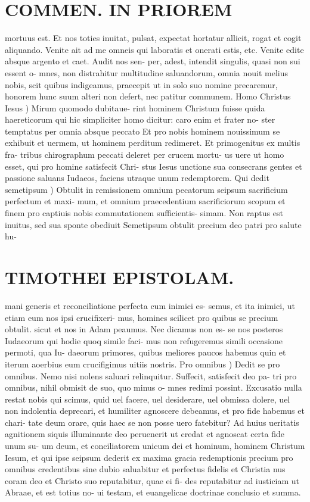 \documentclass{article}
\begin{document}
\begin{pages}
\section*{COMMEN. IN PRIOREM }
\marginpar{[ p.50 ]}\pstart mortuus est. Et nos toties inuitat, pulsat, expectat hortatur allicit, rogat et cogit aliquando. Venite ait ad me omneis qui laboratis et onerati estis, etc. Venite edite absque argento et caet. Audit nos sen- per, adest, intendit singulis, quasi non sui essent o- mnes, non distrahitur multitudine saluandorum, omnia nouit melius nobis, scit quibus indigeamus, praecepit ut in solo suo nomine precaremur, honorem hunc suum alteri non defert, nec patitur communem.  \pend\pstart Homo Christus Iesus ) Mirum quomodo dubitaue- rint hominem Christum fuisse quida haereticorum qui hic simpliciter homo dicitur: caro enim et frater no- ster temptatus per omnia absque peccato Et pro nobis hominem nouissimum se exhibuit et uermem, ut hominem perditum redimeret. Et primogenitus ex multis fra- tribus chirographum peccati deleret per crucem mortu- us uere ut homo esset, qui pro homine satisfecit Chri- stus Iesus unctione sua consecrans gentes et passione saluans Iudaeos, faciens utraque unum redemptorem.  \pend\pstart Qui dedit semetipsum ) Obtulit in remissionem omnium pecatorum seipsum sacrificium perfectum et maxi- mum, et omnium praecedentium sacrificiorum scopum et finem pro captiuis nobis commutationem sufficientis- simam. Non raptus est inuitus, sed sua sponte obediuit Semetipsum obtulit precium deo patri pro salute hu-  \pend
\section*{TIMOTHEI EPISTOLAM. }
\marginpar{[ p.51 ]}\pstart mani generis et reconciliatione perfecta cum inimici es- semus, et ita inimici, ut etiam eum nos ipsi crucifixeri- mus, homines scilicet pro quibus se precium obtulit. sicut et nos in Adam peaumus. Nec dicamus non es- se nos posteros Iudaeorum qui hodie quoq simile faci- mus non refugeremus simili occasione permoti, qua Iu- daeorum primores, quibus meliores paucos habemus quin et iterum aoerbius eum crucifigimus uitiis nostris.  \pend\pstart Pro omnibus ) Dedit se pro omnibus. Nemo nisi nolens saluari relinquitur. Suffecit, satisfecit deo pa- tri pro omnibus, nihil obmisit de suo, quo minus o- mnes redimi possint. Excusatio nulla restat nobis qui scimus, quid uel facere, uel desiderare, uel obmissa dolere, uel non indolentia deprecari, et humiliter agnoscere debeamus, et pro fide habemus et chari- tate deum orare, quis haec se non posse uero fatebitur? Ad huius ueritatis agnitionem siquis illuminante deo peruenerit ut credat et agnoscat certa fide unum su- um deum, et conciliatorem unicum dei et hominum, hominem Christum Iesum, et qui ipse seipsum dederit ex maxima gracia redemptionis precium pro omnibus credentibus sine dubio saluabitur et perfectus fidelis et Christia nus coram deo et Christo suo reputabitur, quae ei fi- des reputabitur ad iusticiam ut Abraae, et est totius no- ui testam, et euangelicae doctrinae conclusio et summa.  \pend

\end{pages}
\end{document}
